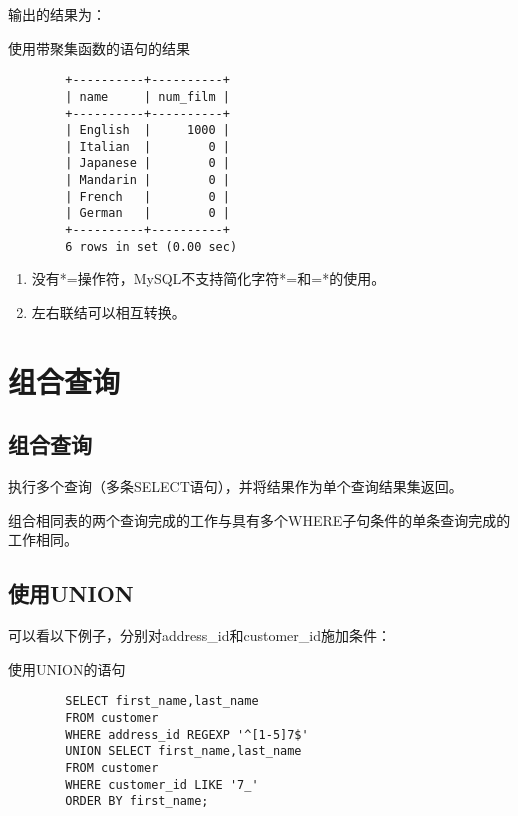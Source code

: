 \documentclass[UTF8]{article}
\begin{document}
输出的结果为：

\begin{listing}[H]
	\caption{使用带聚集函数的语句的结果}
	\label{code:useaggregatefunctionclauseresult}
\begin{verbatim}
        +----------+----------+
        | name     | num_film |
        +----------+----------+
        | English  |     1000 |
        | Italian  |        0 |
        | Japanese |        0 |
        | Mandarin |        0 |
        | French   |        0 |
        | German   |        0 |
        +----------+----------+
        6 rows in set (0.00 sec)
\end{verbatim}
\end{listing}

\begin{orangebox}[frametitle={Tips 16.5.1 外联结注意事项}]
        \begin{enumerate}
                \item 没有*=操作符，MySQL不支持简化字符*=和=*的使用。
                \item 左右联结可以相互转换。
        \end{enumerate}       
\end{orangebox}

\section{组合查询}
\subsection{组合查询}

\begin{redbox}[frametitle={Defination 17.1.1 复合查询（compound query）或并（union）}]
        执行多个查询（多条SELECT语句），并将结果作为单个查询结果集返回。
\end{redbox}

\begin{orangebox}[frametitle={Tips 17.1.2 组合查询注意事项}]
        组合相同表的两个查询完成的工作与具有多个WHERE子句条件的单条查询完成的工作相同。   
\end{orangebox}
\subsection{使用UNION}

可以看以下例子，分别对address\_id和customer\_id施加条件：


\begin{listing}[H]
        \caption{使用UNION的语句}
	\label{code:useunionclause}
\begin{verbatim}
        SELECT first_name,last_name 
        FROM customer 
        WHERE address_id REGEXP '^[1-5]7$' 
        UNION SELECT first_name,last_name 
        FROM customer 
        WHERE customer_id LIKE '7_' 
        ORDER BY first_name;
\end{verbatim}
\end{listing}
\end{document}
